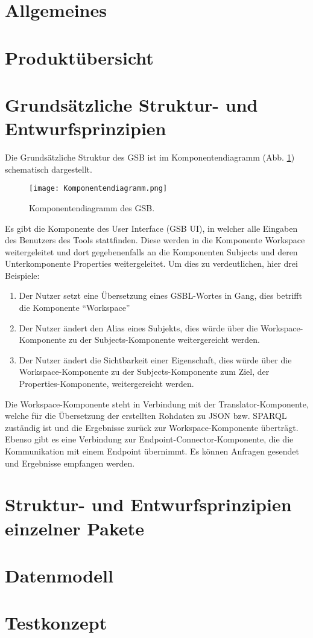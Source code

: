 \pagebreak



\section{Allgemeines}

\section{Produktübersicht}

\section{Grundsätzliche Struktur- und Entwurfsprinzipien}

Die Grundsätzliche Struktur des GSB ist im Komponentendiagramm
(Abb. \ref{fig02}) schematisch dargestellt.

\begin{figure}[h]%
\texttt{[image: Komponentendiagramm.png]}
\caption{Komponentendiagramm des GSB.}
\label{fig02}
\end{figure}


Es gibt die Komponente des User Interface (GSB UI), in welcher alle
Eingaben des Benutzers des Tools stattfinden. Diese werden in die
Komponente Workspace weitergeleitet und dort gegebenenfalls an die
Komponenten Subjects und deren Unterkomponente Properties
weitergeleitet. Um dies zu verdeutlichen, hier drei Beispiele:
\begin{enumerate}
\item Der Nutzer setzt eine Übersetzung eines GSBL-Wortes in Gang, dies betrifft die Komponente “Workspace”
\item Der Nutzer ändert den Alias eines Subjekts, dies würde über die Workspace-Komponente zu der Subjects-Komponente weitergereicht werden.
\item Der Nutzer ändert die Sichtbarkeit einer Eigenschaft, dies würde über die Workspace-Komponente zu der Subjects-Komponente zum Ziel, der Properties-Komponente, weitergereicht werden.
\end{enumerate}
Die Workspace-Komponente steht in Verbindung mit der
Translator-Komponente, welche für die Übersetzung der erstellten
Rohdaten zu JSON bzw. SPARQL zuständig ist und die Ergebnisse zurück
zur Workspace-Komponente überträgt.
Ebenso gibt es eine Verbindung zur Endpoint-Connector-Komponente, die die Kommunikation mit einem Endpoint übernimmt. Es können Anfragen gesendet und Ergebnisse empfangen werden.



\section{Struktur- und Entwurfsprinzipien einzelner Pakete}

\section{Datenmodell}

\section{Testkonzept}

